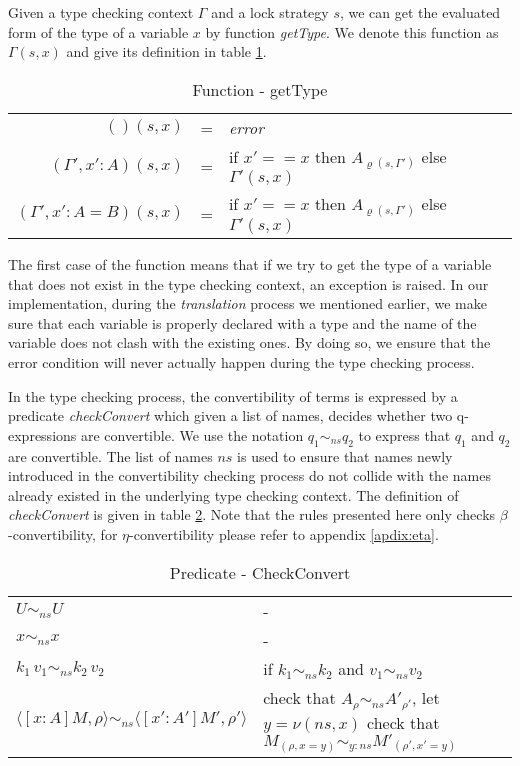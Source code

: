 Given a type checking context $\Gamma$ and a lock strategy $s$, we can get the evaluated form of the type of a variable $x$ by function \emph{getType}. We denote this function as $\Gamma(s,x)$ and give its definition in table \ref{theory:tab:getType}.
\begin{table}[h]
  \centering
  \begin{tabular}{r l l}
    $()(s,x)$ & = & \emph{error} \\
    $(\Gamma', x' : A)(s, x)$ & = & if $x' == x$ then $A_{\varrho(s, \Gamma')}$ else $\Gamma'(s,x)$ \\
    $(\Gamma', x' : A = B)(s, x)$ & = & if $x' == x$ then $A_{\varrho(s, \Gamma')}$ else $\Gamma'(s,x)$
  \end{tabular}
  \caption{Function - getType}
  \label{theory:tab:getType}
\end{table}

The first case of the function means that if we try to get the type of a variable that does not exist in the type checking context, an exception is raised. In our implementation, during the \emph{translation} process we mentioned earlier, we make sure that each variable is properly declared with a type and the name of the variable does not clash with the existing ones. By doing so, we ensure that the error condition will never actually happen during the type checking process.

In the type checking process, the convertibility of terms is expressed by a predicate \emph{checkConvert} which given a list of names, decides whether two q-expressions are convertible. We use the notation $q_1 \sim_{ns} q_2$ to express that $q_1$ and $q_2$ are convertible. The list of names $ns$ is used to ensure that names newly introduced in the convertibility checking process do not collide with the names already existed in the underlying type checking context. The definition of \emph{checkConvert} is given in table \ref{theory:tab:check-convert}. Note that the rules presented here only checks $\beta$-convertibility, for $\eta$-convertibility please refer to appendix \ref{apdix:eta}. 

\begin{table}[h]
  \centering
  \begin{tabular}{l p{8cm}}
    $U \sim_{ns} U$ & - \\
    $x \sim_{ns} x$ & - \\
    $k_1\,v_1 \sim_{ns} k_2\,v_2$ & if $k_1 \sim_{ns} k_2$ and $v_1 \sim_{ns} v_2$ \\
    $\langle [x:A]M,\rho \rangle \sim_{ns} \langle [x':A']M',\rho' \rangle$ & check that $A_\rho \sim_{ns} A'_{\rho'}$, let $y = \nu(ns, x)$ \newline check that $M_{(\rho, x = y)} \sim_{y:ns} M'_{(\rho', x' = y)}$
  \end{tabular}
  \caption{Predicate - CheckConvert}
  \label{theory:tab:check-convert}
\end{table}

